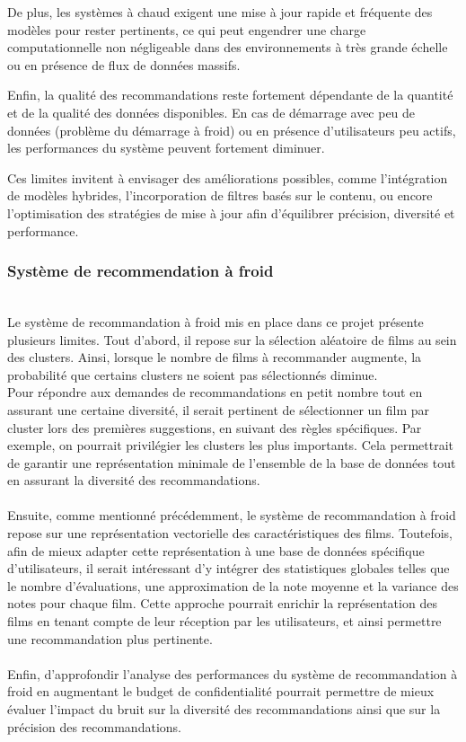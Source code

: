 \documentclass{article}
\begin{document}
De plus, les systèmes à chaud exigent une mise à jour rapide et fréquente des modèles pour rester pertinents, ce qui peut engendrer une charge computationnelle non négligeable dans des environnements à très grande échelle ou en présence de flux de données massifs.

Enfin, la qualité des recommandations reste fortement dépendante de la quantité et de la qualité des données disponibles. En cas de démarrage avec peu de données (problème du démarrage à froid) ou en présence d’utilisateurs peu actifs, les performances du système peuvent fortement diminuer.

Ces limites invitent à envisager des améliorations possibles, comme l’intégration de modèles hybrides, l’incorporation de filtres basés sur le contenu, ou encore l’optimisation des stratégies de mise à jour afin d’équilibrer précision, diversité et performance.


\subsubsection{Système de recommendation à froid}
$ $\\
Le système de recommandation à froid mis en place dans ce projet présente plusieurs limites.
Tout d’abord, il repose sur la sélection aléatoire de films au sein des clusters. Ainsi, lorsque
le nombre de films à recommander augmente, la probabilité que certains clusters ne soient pas sélectionnés diminue.\\
Pour répondre aux demandes de recommandations en petit nombre tout en assurant une certaine diversité, il serait pertinent
de sélectionner un film par cluster lors des premières suggestions, en suivant des règles spécifiques. Par exemple, on
pourrait privilégier les clusters les plus importants. Cela permettrait de garantir une représentation minimale de l’ensemble
de la base de données tout en assurant la diversité des recommandations.\\
\\
Ensuite, comme mentionné précédemment, le système de recommandation à froid repose sur une représentation
vectorielle des caractéristiques des films. Toutefois, afin de mieux adapter cette représentation
à une base de données spécifique d’utilisateurs, il serait intéressant d’y intégrer des
statistiques globales telles que le nombre d’évaluations, une approximation de la note moyenne
et la variance des notes pour chaque film. Cette approche pourrait enrichir la représentation
des films en tenant compte de leur réception par les utilisateurs, et ainsi permettre une recommandation plus pertinente.\\
\\
Enfin, d'approfondir l'analyse des performances du système de recommandation à froid en augmentant le budget de confidentialité
pourrait permettre de mieux évaluer l'impact du bruit sur la diversité des recommandations ainsi que sur la précision des recommandations.
\end{document}
